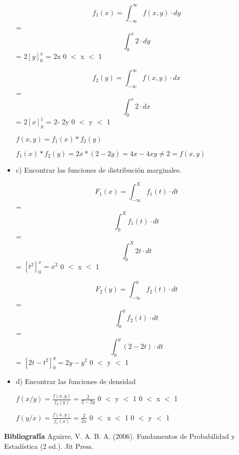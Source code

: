 \documentclass{../oxmathproblems}
\begin{document}
\begin{questions}
\begin{itemize}

\begin{equation}
f_1(x)= \int _{-\infty}^{\infty} f(x,y)  \cdot dy
\end{equation} 
 = 
\begin{equation}
\int _{0}^{x} 2  \cdot dy
\end{equation} 
= $2[y]^x_0 $
= 2x      0 $<$ x $<$ 1 



\begin{equation}
f_2(y)= \int _{-\infty}^{\infty} f(x,y)  \cdot dx
\end{equation} 
 = 
\begin{equation}
\int _{0}^{x} 2  \cdot dx
\end{equation} 
= $2[x]^1_y $
= 2- 2y      0 $<$ y $<$ 1 

$f(x,y)= f_1(x)*f_2(y) $

$f_1(x)*f_2(y) = 2x*(2-2y) = 4x-4xy \neq 2 = f(x,y)$

\item  c) Encontrar las funciones de distribución marginales. 

\begin{equation}
F_1(x) = \int _{-\infty}^{X} f_1(t)  \cdot dt
\end{equation} 
= 
\begin{equation}
 \int _{0}^{X} f_1(t)  \cdot dt
\end{equation} 
= 
\begin{equation}
 \int _{0}^{X} 2t  \cdot dt
\end{equation} 
= $ [t^2]_0^x = x^2 $    0 $<$ x $<$ 1 



\begin{equation}
F_2(y) = \int _{-\infty}^{y} f_2(t)  \cdot dt
\end{equation} 
= 
\begin{equation}
 \int _{0}^{y} f_2(t)  \cdot dt
\end{equation} 
= 
\begin{equation}
 \int _{0}^{y} (2-2t)  \cdot dt
\end{equation} 
= $ [2t - t^2]_0^y = 2y - y^2 $    0 $<$ y $<$ 1 


\item  d) Encontrar las funciones de densidad 

$f(x/y) = \frac{f(x,y)}{f_2(y)} = \frac{2}{2-2y}$   0 $<$ y $<$ 1      0 $<$ x $<$ 1



$f(y/x) = \frac{f(x,y)}{f_1(x)} = \frac{2}{2x} $   0 $<$ x $<$ 1      0 $<$ y $<$ 1
\end{itemize}

\end{questions}



\textbf{Bibliografía}
Aguirre, V. A. B. A. (2006). Fundamentos de Probabilidad y Estadística (2 ed.). Jit Press.
\end{document}
